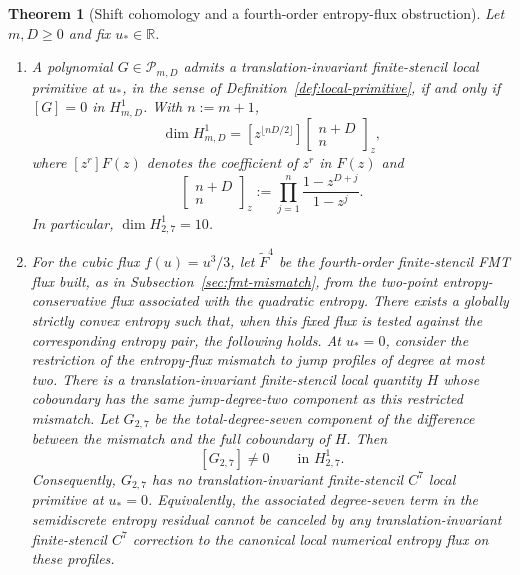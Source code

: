 \documentclass[11pt]{amsart}
\theoremstyle{plain}
\theoremstyle{definition}
\theoremstyle{remark}
\numberwithin{equation}{section}
\theoremstyle{plain}
\newtheorem{lettertheorem}{Theorem}
\begin{document}
\begin{lettertheorem}[Shift cohomology and a fourth-order entropy-flux
obstruction]\label{thm:C}
	Let $m,D\ge0$ and fix $u_*\in\mathbb R$.
	\begin{enumerate}[label=\textup{(\roman*)},leftmargin=2.2em]
		\item A polynomial $G\in\mathscr P_{m,D}$ admits a
		translation-invariant finite-stencil local primitive at $u_*$, in the
		sense of Definition~\ref{def:local-primitive}, if and only if
		$[G]=0$ in $H^1_{m,D}$.  With $n:=m+1$,
		\begin{equation}\label{eq:intro-cohomology-dimension}
			\dim H^1_{m,D}
			=[z^{\lfloor nD/2\rfloor}]
			\begin{bmatrix}n+D\\ n\end{bmatrix}_z,
		\end{equation}
		where $[z^r]F(z)$ denotes the coefficient of $z^r$ in $F(z)$ and
		\[
			\begin{bmatrix}n+D\\ n\end{bmatrix}_z
			:=\prod_{j=1}^{n}\frac{1-z^{D+j}}{1-z^j}.
		\]
		In particular, $\dim H^1_{2,7}=10$.

		\item For the cubic flux \(f(u)=u^3/3\), let
		\(\widetilde F^4\) be the fourth-order finite-stencil FMT flux built,
		as in Subsection~\ref{sec:fmt-mismatch}, from the two-point
		entropy-conservative flux associated with the quadratic entropy.
		There exists a globally strictly convex entropy such that, when this
		fixed flux is tested against the corresponding entropy pair, the
		following holds.  At $u_*=0$, consider the restriction of the entropy-flux
		mismatch to jump profiles of degree at most two.  There is a
		translation-invariant finite-stencil local quantity $H$ whose coboundary
		has the same jump-degree-two component as this restricted mismatch.  Let
		$G_{2,7}$ be the total-degree-seven component of the difference between the
		mismatch and the full coboundary of $H$.  Then
		\[
			[G_{2,7}]\ne0\qquad\text{in }H^1_{2,7}.
		\]
		Consequently, $G_{2,7}$ has no translation-invariant finite-stencil $C^7$
		local primitive at $u_*=0$.
		Equivalently, the associated degree-seven term in the
		semidiscrete entropy residual cannot be canceled by any
		translation-invariant finite-stencil $C^7$ correction to the canonical
		local numerical entropy flux on these profiles.
	\end{enumerate}
\end{lettertheorem}
\end{document}
